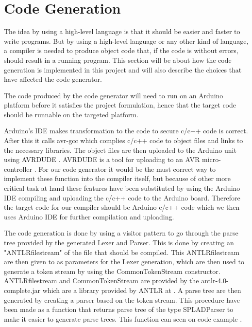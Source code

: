 \section{Code Generation}
The idea by using a high-level language is that it should be easier and faster to write programs. But by using a high-level language or any other kind of language, a compiler is needed to produce object code that, if the code is without errors, should result in a running program. This section will be about how the code generation is implemented in this project and will also describe the choices that have affected the code generator.

The code produced by the code generator will need to run on an Arduino platform before it satisfies the project formulation, hence that the target code should be runnable on the targeted platform.

Arduino's IDE makes transformation to the code to secure c/c++ code is correct. After this it calls avr-gcc which complies c/c++ code to object files and links to the necessary libraries. The object files are then uploaded to the Arduino unit using AVRDUDE . AVRDUDE is a tool for uploading to an AVR micro-controller . For our code generator it would be the must correct way to implement these function into the compiler itself, but because of other more critical task at hand these features have been substituted by using the Arduino IDE compiling and uploading the c/c++ code to the Arduino board. Therefore the target code for our compiler should be Arduino c/c++ code which we then uses Arduino IDE for further compilation and uploading.

The code generation is done by using a visitor pattern to go through the parse tree provided by the generated Lexer and Parser. This is done by creating an "ANTLRfilestream" of the file that should be compiled. This ANTLRfilestream are then given to as parameters for the Lexer generation, which are then used to generate a token stream by using the CommonTokenStream constructor. ANTLRfilestream and CommonTokenStream are provided by the antlr-4.0-complete.jar which are a library provided by ANTLR at . A parse tree are then generated by creating a parser based on the token stream. This procedure have been made as a function that returns parse tree of the type SPLADParser to make it easier to generate parse trees. This function can seen on code example .

